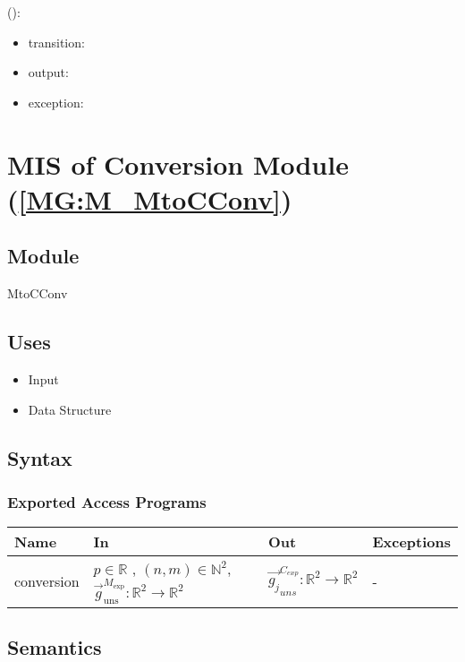 \documentclass[12pt, titlepage]{article}
\begin{document}
\noindent {}():
\begin{itemize}
\item transition:  
\item output:  
\item exception:  
\end{itemize}

\section{MIS of Conversion Module (\texorpdfstring{\cref{MG:M_MtoCConv}}))} \label{MIS_MtoCConv}

\subsection{Module}
MtoCConv
\subsection{Uses}
\begin{itemize}
\item Input
\item Data Structure
\end{itemize}

\subsection{Syntax}

\subsubsection{Exported Access Programs}

\begin{center}
\begin{tabular}{p{2cm} p{4cm} p{4cm} p{2cm}}
\hline
\textbf{Name} & \textbf{In} & \textbf{Out} & \textbf{Exceptions} \\
\hline
conversion & $p \in \mathbb{R}$ , $(n,m) \in \mathbb{N}^2$, $\overrightarrow{g}_{\text{uns}}^{M_{\text{exp}}}:\mathbb{R}^2\rightarrow\mathbb{R}^2$ & $\overrightarrow{g_{j}}_{uns}^{C_{exp}}:\mathbb{R}^2\rightarrow\mathbb{R}^2$ & - \\
\hline
\end{tabular}
\end{center}

\subsection{Semantics}
\end{document}
